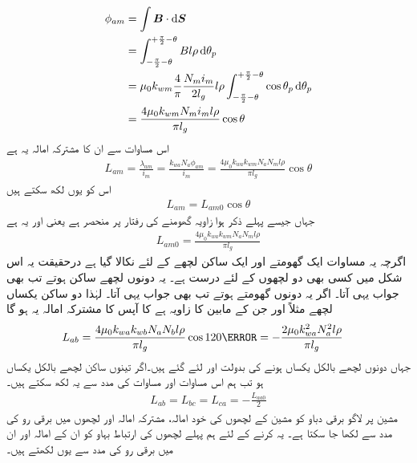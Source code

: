 \begin{gather}
\begin{aligned}
\phi_{am}&=\int \kvec{B} \cdot \dif \kvec{S}\\
&=\int_{-\frac{\pi}{2}-\theta}^{+\frac{\pi}{2}-\theta} B l \rho \dif \theta_p\\
&=\mu_0 k_{wm} \frac{4}{\pi}\frac{N_m i_m}{2 l_g} l \rho \int_{-\frac{\pi}{2}-\theta}^{+\frac{\pi}{2}-\theta} \cos \theta_p \dif \theta_p\\
&=\frac{4 \mu_0 k_{wm}  N_m i_m l \rho}{\pi l_g} \cos \theta
\end{aligned}
\end{gather}
اس مساوات سے ان کا مشترکہ امالہ  یہ ہے 
\begin{align}
L_{am}=\frac{\lambda_{am}}{i_m}=\frac{k_{wa} N_a \phi_{am}}{i_m}=\frac{4 \mu_0 k_{wa} k_{wm} N_a N_m l \rho}{\pi l_g} \cos \theta
\end{align}
اس کو یوں لکھ سکتے ہیں
\begin{align}\label{مساوات_معاصر_ساکن_گھومتا_مشترکہ_امالہ}
L_{am}=L_{am0} \cos \theta
\end{align}
جہاں جیسے پہلے ذکر ہوا زاویہ  گھومنے کی رفتار پر منحصر ہے یعنی   اور   یہ ہے
\begin{align}
L_{am0}=\frac{4 \mu_0 k_{wa} k_{wm} N_a N_m l \rho}{\pi l_g} 
\end{align}
اگرچہ یہ مساوات ایک گھومتے اور ایک ساکن لچھے کے لئے نکالا گیا ہے درحقیقت یہ اس شکل میں کسی بھی دو لچھوں کے لئے درست ہے۔ یہ دونوں لچھے ساکن ہوتے تب بھی جواب یہی آتا۔ اگر یہ دونوں گھومتے ہوتے تب بھی جواب یہی آتا۔ لہٰذا دو ساکن  یکساں لچھے مثلاً  اور  جن کے مابین  کا زاویہ ہے کا آپس کا مشترکہ امالہ یہ ہو گا
\begin{align}
L_{ab}&=\frac{4 \mu_0 k_{wa} k_{wb} N_a N_b l \rho}{\pi l_g} \cos 120\degree=-\frac{2 \mu_0 k_{wa}^2  N_a^2 l \rho}{\pi l_g}
\end{align}
جہاں دونوں لچھے بالکل یکساں ہونے کی بدولت   اور  لئے گئے ہیں۔اگر تینوں ساکن لچھے بالکل یکساں ہو تب ہم اس مساوات اور مساوات  کی مدد سے یہ لکھ سکتے ہیں۔ 
\begin{align}\label{مساوات_معاصر_ساکن_مشترکہ_امالہ}
L_{ab}=L_{bc}=L_{ca}=-\frac{L_{aa0}}{2}
\end{align}
%
مشین پر لاگو برقی دباو کو مشین کے لچھوں کی خود امالہ، مشترکہ امالہ اور لچھوں میں برقی رو کی مدد سے لکھا جا سکتا ہے۔ یہ کرنے کے لئے ہم پہلے  لچھوں کی ارتباط بہاو  کو ان کے امالہ اور ان میں برقی رو کی مدد سے یوں لکھتے ہیں۔
